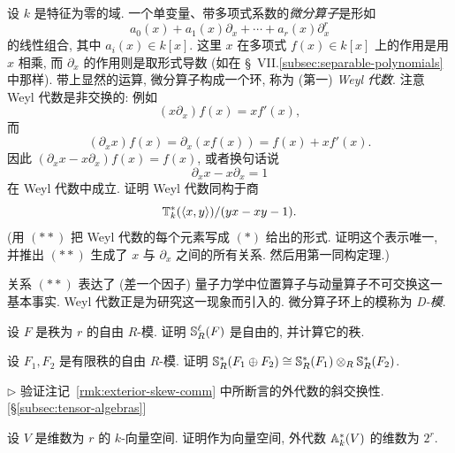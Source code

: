 \begin{prob}\label{ex:weyl-algebra}
设 $k$ 是特征为零的域. 一个单变量、带多项式系数的\emph{微分算子}是形如
\begin{equation*}\tag{$*$}
a_0(x)+a_1(x)\partial_x+\cdots+a_r(x)\partial_x^r
\end{equation*}
的线性组合, 其中 $a_i(x)\in k[x]$. 这里 $x$ 在多项式 $f(x)\in k[x]$ 上的作用是用 $x$ 相乘, 而 $\partial_x$ 的作用则是取形式导数 (如在 \S~VII.\ref{subsec:separable-polynomials} 中那样). 带上显然的运算, 微分算子构成一个环, 称为 (第一) \emph{Weyl 代数}. 注意 Weyl 代数是非交换的: 例如
\[
(x\partial_x)f(x)=xf'(x),
\]
而
\[
(\partial_x x)f(x)=\partial_x(xf(x))=f(x)+xf'(x).
\]
因此 $(\partial_x x-x\partial_x)f(x)=f(x)$, 或者换句话说
\begin{equation*}\tag{$**$}
\partial_x x-x\partial_x=1
\end{equation*}
在 Weyl 代数中成立. 证明 Weyl 代数同构于商
\[
\mathbb{T}^*_k(\langle x,y\rangle)/(yx-xy-1).
\]
(用 $(**)$ 把 Weyl 代数的每个元素写成 $(*)$ 给出的形式. 证明这个表示唯一, 并推出 $(**)$ 生成了 $x$ 与 $\partial_x$ 之间的所有关系. 然后用第一同构定理.)

关系 $(**)$ 表达了 (差一个因子) 量子力学中位置算子与动量算子不可交换这一基本事实. Weyl 代数正是为研究这一现象而引入的. 微分算子环上的模称为 \emph{D-模}.
\end{prob}

\begin{prob}\label{ex:symmetric-power-free}
设 $F$ 是秩为 $r$ 的自由 $R$-模. 证明 $\mathbb{S}_R^\ell(F)$ 是自由的, 并计算它的秩.
\end{prob}

\begin{prob}\label{ex:symmetric-algebra-direct-sum}
设 $F_1,F_2$ 是有限秩的自由 $R$-模. 证明 $\mathbb{S}_R^*(F_1\oplus F_2)\cong\mathbb{S}_R^*(F_1)\otimes_R\mathbb{S}_R^*(F_2)$.
\end{prob}

\begin{prob}\label{ex:exterior-skew-comm}
$\triangleright$ 验证注记~\ref{rmk:exterior-skew-comm} 中所断言的外代数的斜交换性. [§\ref{subsec:tensor-algebras}]
\end{prob}

\begin{prob}\label{ex:exterior-algebra-dimension}
设 $V$ 是维数为 $r$ 的 $k$-向量空间. 证明作为向量空间, 外代数 $\mathbb{A}_k^*(V)$ 的维数为 $2^r$.
\end{prob}

